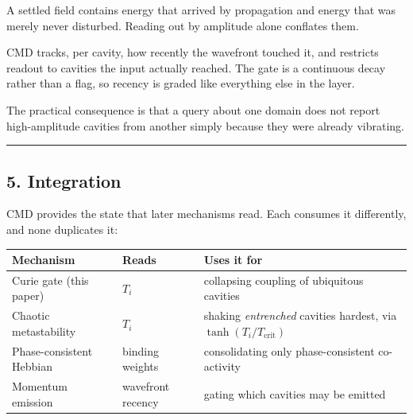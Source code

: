 \documentclass[
  11pt,
  a4paper,
]{article}
\begin{document}
A settled field contains energy that arrived by propagation and energy
that was merely never disturbed. Reading out by amplitude alone
conflates them.

CMD tracks, per cavity, how recently the wavefront touched it, and
restricts readout to cavities the input actually reached. The gate is a
continuous decay rather than a flag, so recency is graded like
everything else in the layer.

The practical consequence is that a query about one domain does not
report high-amplitude cavities from another simply because they were
already vibrating.

\begin{center}\rule{0.5\linewidth}{0.5pt}\end{center}

\subsection{5. Integration}\label{integration}

CMD provides the state that later mechanisms read. Each consumes it
differently, and none duplicates it:

\begin{longtable}[]{@{}
  >{\raggedright\arraybackslash}p{}
  >{\raggedright\arraybackslash}p{}
  >{\raggedright\arraybackslash}p{}@{}}
\toprule\noalign{}
\begin{minipage}[b]{\linewidth}\raggedright
Mechanism
\end{minipage} & \begin{minipage}[b]{\linewidth}\raggedright
Reads
\end{minipage} & \begin{minipage}[b]{\linewidth}\raggedright
Uses it for
\end{minipage} \\
\midrule\noalign{}
\endhead
\bottomrule\noalign{}
\endlastfoot
Curie gate (this paper) & \(T_i\) & collapsing coupling of ubiquitous
cavities \\
Chaotic metastability & \(T_i\) & shaking \emph{entrenched} cavities
hardest, via \(\tanh(T_i/T_{\text{crit}})\) \\
Phase-consistent Hebbian & binding weights & consolidating only
phase-consistent co-activity \\
Momentum emission & wavefront recency & gating which cavities may be
emitted \\
\end{longtable}
\end{document}
